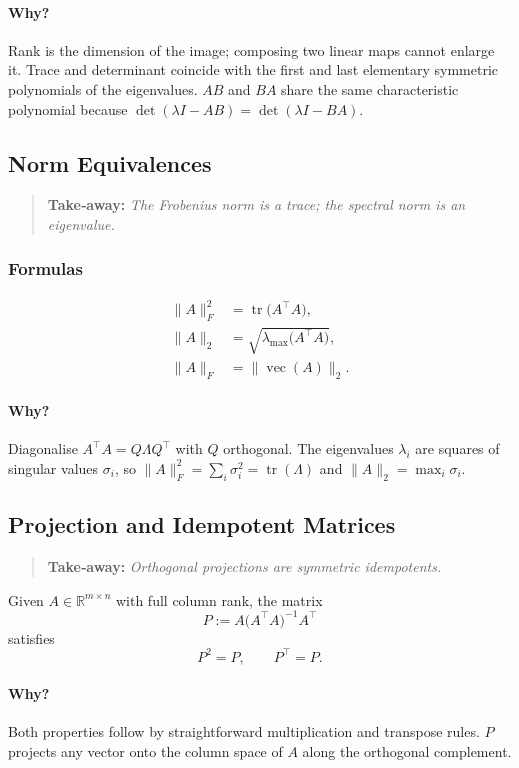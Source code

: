 \paragraph{Why?}
Rank is the dimension of the image; composing two linear maps cannot enlarge it.
Trace and determinant coincide with the first and last elementary symmetric polynomials of the eigenvalues.
$AB$ and $BA$ share the same characteristic polynomial because $\det(\lambda I-AB)=\det(\lambda I-BA)$.

\subsection{Norm Equivalences}
\begin{quote}
\textbf{Take‑away:} \emph{The Frobenius norm is a trace; the spectral norm is an eigenvalue.}
\end{quote}

\subsubsection*{Formulas}
\begin{align}
\|A\|_F^2 &= \operatorname{tr}\!\bigl(A^\top A\bigr),\\[4pt]
\|A\|_2   &= \sqrt{\lambda_{\max}\!\bigl(A^\top A\bigr)},\\[4pt]
\|A\|_F   &= \|\operatorname{vec}(A)\|_2.
\end{align}

\paragraph{Why?}
Diagonalise $A^\top A=Q\Lambda Q^\top$ with $Q$ orthogonal.
The eigenvalues $\lambda_i$ are squares of singular values $\sigma_i$,
so $\|A\|_F^2=\sum_i\sigma_i^{2}=\operatorname{tr}(\Lambda)$ and
$\|A\|_2=\max_i\sigma_i$.

\subsection{Projection and Idempotent Matrices}
\begin{quote}
\textbf{Take‑away:} \emph{Orthogonal projections are symmetric idempotents.}
\end{quote}

Given $A\in\mathbb R^{m\times n}$ with full column rank, the matrix
\[
P := A\bigl(A^\top A\bigr)^{-1}A^\top
\]
satisfies
\[
P^2=P,\qquad P^\top = P.
\]

\paragraph{Why?}
Both properties follow by straightforward multiplication and transpose rules.
$P$ projects any vector onto the column space of $A$ along the orthogonal complement.

